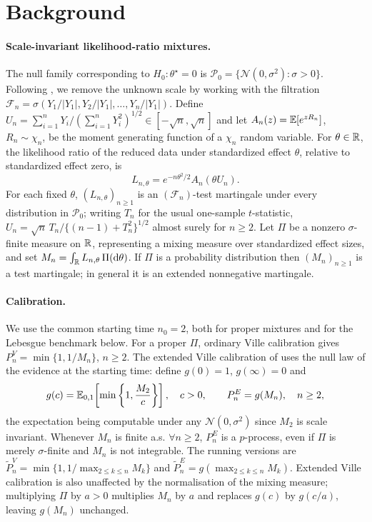 \documentclass{article}
\begin{document}
\section{Background}
\label{sec:background}
\vspace{-4pt}
\paragraph{Scale-invariant likelihood-ratio mixtures.}
The null family corresponding to $H_0:\theta^\star=0$ is
$\mathcal P_0=\{\mathcal N(0,\sigma^2):\sigma>0\}$. Following
\citet{Lai1976,PerezOrtiz2024,Wang2025}, we remove the unknown scale by
working with the filtration
$\mathcal F_n=\sigma(Y_1/|Y_1|,Y_2/|Y_1|,\ldots,Y_n/|Y_1|)$. Define
$U_n=\sum_{i=1}^nY_i/(\sum_{i=1}^nY_i^2)^{1/2}\in[-\sqrt n,\sqrt n]$ and
let $A_n(z)=\mathbb{E}[e^{zR_n}]$, $R_n\sim\chi_n$, be the moment generating
function of a $\chi_n$ random variable. For $\theta\in\mathbb{R}$, the likelihood
ratio of the reduced data under standardized effect $\theta$, relative to
standardized effect zero, is
\begin{equation}
\label{eq:hthetadef}
  L_{n,\theta}=e^{-n\theta^2/2}A_n(\theta U_n).
\end{equation}
For each fixed $\theta$, $(L_{n,\theta})_{n\geq1}$ is an
$(\mathcal F_n)$-test martingale under every distribution in
$\mathcal P_0$; writing $T_n$ for the usual one-sample $t$-statistic,
$U_n=\sqrt n\,T_n/\{(n-1)+T_n^2\}^{1/2}$ almost surely for $n\geq2$. Let
$\Pi$ be a nonzero $\sigma$-finite measure on $\mathbb{R}$, representing a mixing
measure over standardized effect sizes, and set
$M_n=\int_{\mathbb{R}} L_{n,\theta}\,\Pi(\mathrm{d}\theta)$. If $\Pi$ is a probability
distribution then $(M_n)_{n\geq1}$ is a test martingale; in general it is
an extended nonnegative martingale.

\paragraph{Calibration.}
We use the common starting time $n_0=2$, both for proper mixtures and for
the Lebesgue benchmark below. For a proper $\Pi$, ordinary Ville
calibration gives $P_n^V=\min\{1,1/M_n\}$, $n\geq2$. The extended Ville
calibration of \citet{Wang2025a} uses the null law of the evidence at the
starting time: define $g(0)=1$, $g(\infty)=0$ and
\begin{equation}
\label{eq:general-extended-calibration}
  g(c)=\mathbb{E}_{0,1}\!\left[\min\left\{1,\frac{M_2}{c}\right\}\right],
  \quad c>0,
  \qquad
  P_n^E=g(M_n),
  \quad n\geq2,
\end{equation}
the expectation being computable under any $\mathcal N(0,\sigma^2)$ since
$M_2$ is scale invariant. Whenever $M_n$ is finite a.s.
$\forall n\geq2$, $P_n^E$ is a $p$-process, even if $\Pi$ is merely
$\sigma$-finite and $M_n$ is not integrable. The running
versions are
$\widetilde P_n^V=\min\{1,1/\max_{2\leq k\leq n}M_k\}$ and
$\widetilde P_n^E=g(\max_{2\leq k\leq n}M_k)$. Extended Ville calibration is also unaffected by the normalisation of the mixing measure; multiplying $\Pi$ by $a>0$ multiplies $M_n$ by $a$ and replaces $g(c)$ by $g(c/a)$, leaving $g(M_n)$ unchanged.
\vspace{-4pt}
\end{document}
